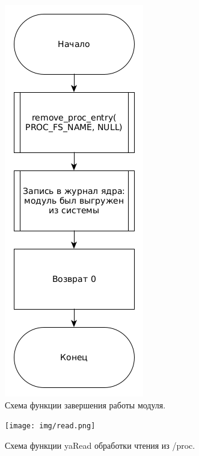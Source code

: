 \begin{figure}[H]
	\centering
	\includegraphics[scale=0.5]{img/exit.png}
	\caption{Схема функции завершения работы модуля.}
	\label{fig:exit}
\end{figure}

\begin{figure}[H]
	\centering
	\texttt{[image: img/read.png]}
	\caption{Схема функции yaRead обработки чтения из /proc. }
	\label{fig:read}
\end{figure}

